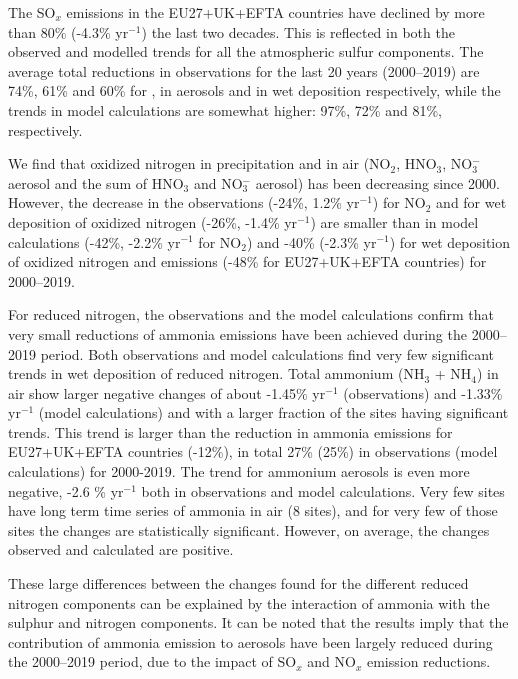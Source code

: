 The SO$_x$ emissions in the EU27+UK+EFTA countries have declined by more than 80\% (-4.3\% yr$^{-1}$) the last two decades. This is reflected in both the observed and modelled trends for all the atmospheric sulfur components. The average total reductions in observations for the last 20 years (2000--2019) are 74\%, 61\% and 60\% for \soii, \soiv in aerosols and in wet deposition respectively, while the trends in model calculations are somewhat higher: 97\%, 72\% and 81\%, respectively.

We find that oxidized nitrogen in precipitation and in air (NO$_2$, HNO$_3$, NO$_3^{-}$ aerosol and the sum of HNO$_3$ and NO$_3^{-}$ aerosol) has been decreasing since 2000. However, the decrease in the observations (-24\%, 1.2\% yr$^{-1}$) for NO$_2$ and for wet deposition of oxidized nitrogen (-26\%, -1.4\% yr$^{-1}$) are smaller than in model calculations (-42\%, -2.2\% yr$^{-1}$ for NO$_2$) and -40\% (-2.3\% yr$^{-1}$) for wet deposition of oxidized nitrogen and emissions (-48\% for EU27+UK+EFTA countries) for 2000--2019.

For reduced nitrogen, the observations and the model calculations confirm that very small reductions of ammonia emissions have been achieved during the 2000--2019 period. 
Both observations and model calculations find very few significant trends in wet deposition of reduced nitrogen.
Total ammonium (NH$_3$ + NH$_4$) in air show larger negative changes of about -1.45\% yr$^{-1}$ (observations) and -1.33\% yr$^{-1}$ (model calculations) and with a larger fraction of the sites having significant trends. This trend is larger than the reduction in ammonia emissions for EU27+UK+EFTA countries (-12\%), in total 27\% (25\%) in observations (model calculations) for 2000-2019. The trend for ammonium aerosols is even more negative, -2.6 \% yr$^{-1}$ both in observations and model calculations. Very few sites have long term time series of ammonia in air (8 sites), and for very few of those sites the changes are statistically significant. However, on average, the changes observed and calculated are positive. 

These large differences between the changes found for the different reduced nitrogen components can be explained by the interaction of ammonia with the sulphur and nitrogen components. It can be noted that the results imply that the contribution of ammonia emission to aerosols have been largely reduced during the 2000--2019 period, due to the impact of SO$_x$ and NO$_x$ emission reductions. 

